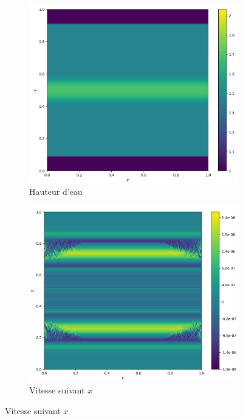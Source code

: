 \documentclass[
	french,
	11pt, %
]{fphw}
\begin{document}
\begin{figure}[H]
	\centering
	\begin{subfigure}{0.32\textwidth}
		\centering
		\includegraphics[width=\textwidth,height=0.85\textwidth]{Riem2h.png}
		\caption{Hauteur d'eau}
		\label{fig:Riem2h}
	\end{subfigure}
	\begin{subfigure}{0.32\textwidth}
		\centering
		\includegraphics[width=\textwidth,height=0.85\textwidth]{Riem2u.png}
		\caption{Vitesse suivant $x$}

\end{subfigure}
\end{figure}
\end{document}
